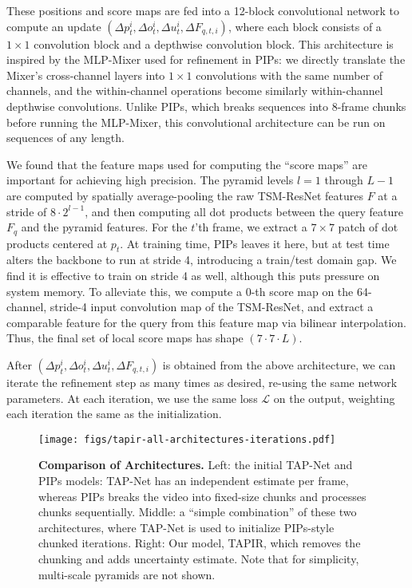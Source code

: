 \documentclass[10pt,twocolumn,letterpaper]{article}
\begin{document}
These positions and score maps are fed into a 12-block convolutional network to compute an update $(\Delta p^i_t, \Delta o^i_t, \Delta u^i_t, \Delta F_{q,t,i})$, where each block consists of a $1\times 1$ convolution block and a depthwise convolution block.  This architecture is inspired by the
MLP-Mixer used for refinement in PIPs: we directly translate the Mixer's cross-channel layers into $1\times 1$ convolutions with the same number of channels, and the within-channel operations become similarly within-channel depthwise convolutions.  Unlike PIPs, which breaks sequences into 8-frame chunks before running the MLP-Mixer, this convolutional architecture can be run on sequences of any length.  


We found that the feature maps used for computing the ``score maps'' are important for achieving high precision. The pyramid levels $l=1$ through $L-1$ are computed by spatially average-pooling the raw TSM-ResNet features $F$ at a stride of $8\cdot 2^{l-1}$, and then computing all dot products between the query feature $F_q$ and the pyramid features.  For the $t$'th frame, we extract a $7\times 7$ patch of dot products centered at $p_t$.  At training time, PIPs leaves it here, but at test time alters the backbone to run at stride 4, introducing a train/test domain gap.  We find it is effective to train on stride 4 as well, although this puts pressure on system memory.  To alleviate this, we compute a 0-th score map on the 64-channel, stride-4 input convolution map of the TSM-ResNet, and extract a comparable feature for the query from this feature map via bilinear interpolation.  Thus, the final set of local score maps has shape $(7\cdot 7 \cdot L)$. 

After $(\Delta p^i_t, \Delta o^i_t, \Delta u^i_t, \Delta F_{q,t,i})$ is obtained from the above architecture, we can iterate the refinement step as many times as desired, re-using the same network parameters.  At each iteration, we use the same loss $\mathcal{L}$ on the output, weighting each iteration the same as the initialization.

\begin{figure*}[t]
\begin{center}
\texttt{[image: figs/tapir-all-architectures-iterations.pdf]}
\end{center}
   \caption{\textbf{Comparison of Architectures.} Left: the initial TAP-Net and PIPs models: TAP-Net has an independent estimate per frame, whereas PIPs breaks the video into fixed-size chunks and processes chunks sequentially.  Middle: a ``simple combination'' of these two architectures, where TAP-Net is used to initialize PIPs-style chunked iterations.  Right: Our model, TAPIR, which removes the chunking and adds uncertainty estimate. Note that for simplicity, multi-scale pyramids are not shown.}
\label{fig:arch_compare}
\end{figure*}
\end{document}
